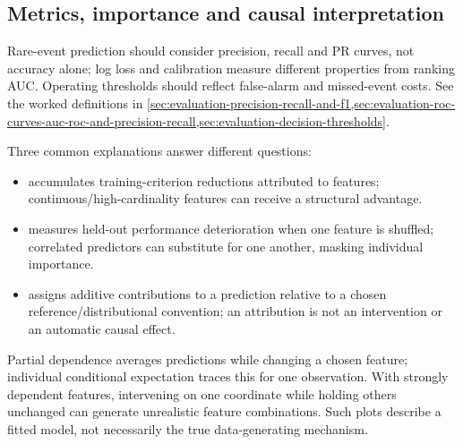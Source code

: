 \subsection{Metrics, importance and causal interpretation}
\label{subsec:trees-metrics-importance-and-causal-interpretation}
Rare-event prediction should consider precision, recall and PR curves, not accuracy alone; log loss and calibration measure different properties from ranking AUC.
Operating thresholds should reflect false-alarm and missed-event costs.
See the worked definitions in \cref{sec:evaluation-precision-recall-and-f1,sec:evaluation-roc-curves-auc-roc-and-precision-recall,sec:evaluation-decision-thresholds}.

Three common explanations answer different questions:
\begin{itemize}
\item {} accumulates training-criterion reductions attributed to features; continuous/high-cardinality features can receive a structural advantage.
\item {} measures held-out performance deterioration when one feature is shuffled; correlated predictors can substitute for one another, masking individual importance.
\item {} assigns additive contributions to a prediction relative to a chosen reference/distributional convention; an attribution is not an intervention or an automatic causal effect.
\end{itemize}
Partial dependence averages predictions while changing a chosen feature; individual conditional expectation traces this for one observation.
With strongly dependent features, intervening on one coordinate while holding others unchanged can generate unrealistic feature combinations.
Such plots describe a fitted model, not necessarily the true data-generating mechanism.

